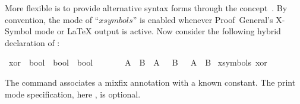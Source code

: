 \begin{isabellebody}
\begin{isamarkuptext}
  More flexible is to provide alternative syntax forms
  through the  concept~\cite{isabelle-ref}.  By
  convention, the mode of ``$xsymbols$'' is enabled whenever
  Proof~General's X-Symbol mode or {\LaTeX} output is active.  Now
  consider the following hybrid declaration of :%
\end{isamarkuptext}%
\isamarkuptrue%
%
\isadelimML
%
\endisadelimML
%
\isatagML
%
\endisatagML
{\isafoldML}%
%
\isadelimML
%
\endisadelimML
{}\isamarkupfalse%
\ xor\ {\isacharcolon}{\isacharcolon}\ {\isachardoublequoteopen}bool\ {\isasymRightarrow}\ bool\ {\isasymRightarrow}\ bool{\isachardoublequoteclose}\ \ \ \ {\isacharparenleft}\ {\isachardoublequoteopen}{\isacharbrackleft}{\isacharplus}{\isacharbrackright}{\isasymignore}{\isachardoublequoteclose}\ {}{}{\isacharparenright}\isanewline
{}\ {\isachardoublequoteopen}A\ {\isacharbrackleft}{\isacharplus}{\isacharbrackright}{\isasymignore}\ B\ {\isasymequiv}\ {\isacharparenleft}A\ {\isasymand}\ {\isasymnot}\ B{\isacharparenright}\ {\isasymor}\ {\isacharparenleft}{\isasymnot}\ A\ {\isasymand}\ B{\isacharparenright}{\isachardoublequoteclose}\isanewline
\isanewline
{}\isamarkupfalse%
\ {\isacharparenleft}xsymbols{\isacharparenright}\ xor\ {\isacharparenleft}\ {\isachardoublequoteopen}{\isasymoplus}{\isasymignore}{\isachardoublequoteclose}\ {}{}{\isacharparenright}%
\isadelimML
%
\endisadelimML
%
\isatagML
%
\endisatagML
{\isafoldML}%
%
\isadelimML
%
\endisadelimML
%
\begin{isamarkuptext}%
\noindent
The  command associates a mixfix
annotation with a known constant.  The print mode specification,
here , is optional.


\end{isamarkuptext}
\end{isabellebody}
